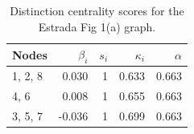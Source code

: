\begin{table}
\centering
\caption{\label{tab:estrada1a}Distinction centrality scores for the Estrada Fig 1(a) graph.}
\centering
\begin{tabular}[t]{lrrrr}
\toprule
Nodes & $\beta_i$ & $s_i$ & $\kappa_i$ & $\alpha$\\
\midrule
1, 2, 8 & 0.030 & 1 & 0.633 & 0.663\\
4, 6 & 0.008 & 1 & 0.655 & 0.663\\
3, 5, 7 & -0.036 & 1 & 0.699 & 0.663\\
\bottomrule
\end{tabular}
\end{table}
